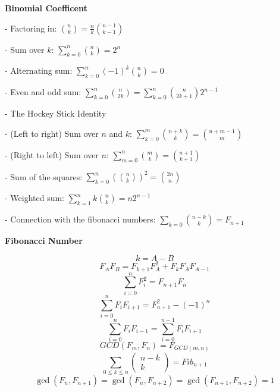 \textbf{Binomial Coefficent}

- Factoring in: \( \binom{n}{k} = \frac{n}{k} \binom{n - 1}{k - 1} \)

- Sum over \( k \): \( \sum_{k = 0}^n \binom{n}{k} = 2^n \)

- Alternating sum: \( \sum_{k = 0}^n (-1)^k \binom{n}{k} = 0 \)

- Even and odd sum: \( \sum_{k = 0}^n \binom{n}{2k} = \sum_{k = 0}^n \binom{n}{2k + 1} 2^{n - 1} \)

- The Hockey Stick Identity

   - (Left to right) Sum over \( n \) and \( k \): \( \sum_{k = 0}^m \binom{n + k}{k} = \binom{n + m - 1}{m} \)

   - (Right to left) Sum over \( n \): \( \sum_{m = 0}^n \binom{m}{k} = \binom{n + 1}{k + 1} \)

- Sum of the squares: \( \sum_{k = 0}^n (\binom{n}{k})^2 = \binom{2n}{n} \)

- Weighted sum: \( \sum_{k = 1}^n k \binom{n}{k} = n2^{n - 1} \)

- Connection with the fibonacci numbers: \( \sum_{k = 0}\binom{n - k}{k} = F_{n + 1} \)

\textbf{Fibonacci Number}

$$
k=A-B
$$
\begin{equation}
F_A F_B=F_{k+1} F_A^2+F_k F_A F_{A-1}
\end{equation}
\begin{equation}
\sum_{i=0}^n F_i^2=F_{n+1} F_n
\end{equation}
\begin{equation}
\sum_{i=0}^n F_i F_{i+1}=F_{n+1}^2-(-1)^n 
\end{equation}
\begin{equation}
    \sum_{i=0}^n F_i F_{i-1}=\sum_{i=0}^{n-1} F_i F_{i+1}
\end{equation}
\begin{equation}
G C D\left(F_m, F_n\right)=F_{G C D(m, n)}
\end{equation}
\begin{equation}
\sum_{0 \leq k \leq n}\left(\begin{array}{c}
n-k \\
k
\end{array}\right)=F i b_{n+1}
\end{equation}
\begin{equation}
\operatorname{gcd}\left(F_n, F_{n+1}\right)=\operatorname{gcd}\left(F_n, F_{n+2}\right)= \operatorname{gcd}\left(F_{n+1}, F_{n+2}\right)=1
\end{equation}

